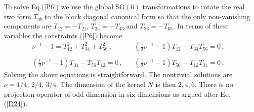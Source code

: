 \documentclass[a4paper,11pt]{article}
\begin{document}
To solve Eq.(\ref{P6}) we  use the global $\mbox{SO}(6)$ transformations to rotate the real two form $T_{ab}$ to the block diagonal canonical form
so that the only non-vanishing components are $T_{12}=-T_{21}$, $T_{34}=-T_{43}$ and $T_{56}=-T_{65}$. In terms of these variables the constraints
(\ref{P6}) become
\begin{equation}
\begin{array}{ll}
\nu^{-1}-1=T_{12}^2 +T_{34}^2+T_{56}^2\,, ~~&~~ (\displaystyle{\frac{1}{2}}\nu^{-1} -1) T_{12}-T_{34}T_{56}=0\,,
\\{}&{}\\(\displaystyle{\frac{1}{2}}\nu^{-1} -1)  T_{34} -T_{56}T_{12}=0\,,~~&~~
(\displaystyle{\frac{1}{2}}\nu^{-1} -1)  T_{56} -T_{12}T_{34}=0\,.
\end{array}
\end{equation}
Solving the above equations is straightforward.  The nontrivial solutions  are $\nu=1/4,\, 2/4,\, 3/4$. The dimension of the kernel $N$ is then
$2,4,6$. There is no projection operator of odd dimension in six dimensions as argued after  Eq.(\ref{D24}).
\end{document}
